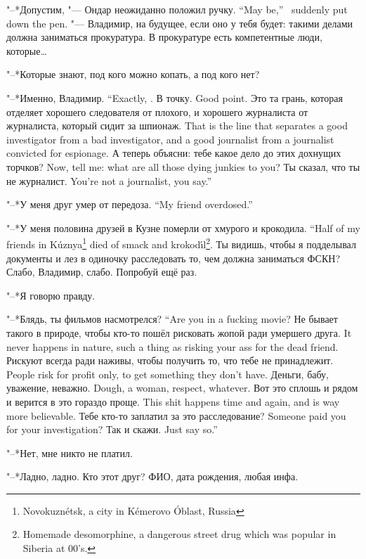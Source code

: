 {"--*Допустим, "--- Ондар неожиданно положил ручку.}
{``May be,'' \Ondar\ suddenly put down the pen.}
"--- Владимир, на будущее, если оно у тебя будет: такими делами должна заниматься прокуратура.
В прокуратуре есть компетентные люди, которые\dots{}

"--*Которые знают, под кого можно копать, а под кого нет?

{"--*Именно, Владимир.}
{``Exactly, \Vladimir.}
{В точку.}
{Good point.}
{Это та грань, которая отделяет хорошего следователя от плохого, и хорошего журналиста от журналиста, который сидит за шпионаж.}
{That is the line that separates a good investigator from a bad investigator, and a good journalist from a journalist convicted for espionage.}
{А теперь объясни: тебе какое дело до этих дохнущих торчков?}
{Now, tell me: what are all those dying junkies to you?}
{Ты сказал, что ты не журналист.}
{You're not a journalist, you say.''}

{"--*У меня друг умер от передоза.}
{``My friend overdosed.''}

{"--*У меня половина друзей в Кузне померли от хмурого и крокодила.}
{``Half of my friends in K\'uznya\footnote{Novokuzn\'etsk, a city in K\'emerovo \'Oblast, Russia} died of smack and krokod\'{\i}l\footnote{Homemade desomorphine, a dangerous street drug which was popular in Siberia at 00's.}.}
Ты видишь, чтобы я подделывал документы и лез в одиночку расследовать то, чем должна заниматься ФСКН?
Слабо, Владимир, слабо.
Попробуй ещё раз.

"--*Я говорю правду.

{"--*Блядь, ты фильмов насмотрелся?}
{``Are you in a fucking movie?}
{Не бывает такого в природе, чтобы кто-то пошёл рисковать жопой ради умершего друга.}
{It never happens in nature, such a thing as risking your ass for the dead friend.}
{Рискуют всегда ради наживы, чтобы получить то, что тебе не принадлежит.}
{People risk for profit only, to get something they don't have.}
{Деньги, бабу, уважение, неважно.}
{Dough, a woman, respect, whatever.}
{Вот это сплошь и рядом и верится в это гораздо проще.}
{This shit happens time and again, and is way more believable.}
{Тебе кто-то заплатил за это расследование?}
{Someone paid you for your investigation?}
{Так и скажи.}
{Just say so.''}

"--*Нет, мне никто не платил.

"--*Ладно, ладно.
Кто этот друг?
ФИО, дата рождения, любая инфа.

